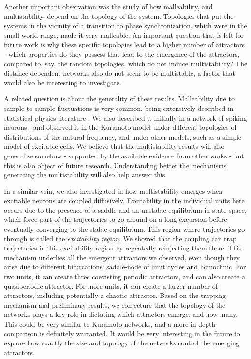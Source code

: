 Another important observation was the study of how malleability, and multistability, depend on the topology of the system. Topologies that put the systems in the vicinity of a transition to phase synchronization, which were in the small-world range, made it very malleable. An important question that is left for future work is why these specific topologies lead to a higher number of attractors - which properties do they possess that lead to the emergence of the attractors, compared to, say, the random topologies, which do not induce multistability? The distance-dependent networks also do not seem to be multistable, a factor that would also be interesting to investigate. 

A related question is about the generality of these results. Malleability due to sample-to-sample fluctuations is very common, being extensively described in statistical physics literature \cite{sornette2006critical}. We also described it initially in a network of spiking neurons \cite{budzinski2020synchronization}, and observed it in the Kuramoto model under different topologies of distributions of the natural frequency, and under other models, such as a simple model of excitable cells. We believe that the multistability results will also generalize somehow - supported by the available evidence from other works - but this is also object of future research. Understanding better the mechanisms generating the multistability will also help answer this.

In a similar vein, we also investigated in  how multistability emerges when excitable neurons are coupled diffusively. Excitability in the individual units here occurs due to the presence of a saddle and an unstable equilibrium in state space, which force part of the trajectories to go around on a long excursion before eventually converging to the stable equilibrium. This region where trajectories go through is called the \textit{excitability region}. We showed that the coupling can trap trajectories in this excitability region by repeatedly reinjecting them there. This mechanism underlies all the emergent attractors we observed, even though they arise due to different bifurcations: saddle-node of limit cycles and homoclinic. For two units, it can create three coexisting periodic attractors, and can also create a quasiperiodic attractor. For more units, it can create a larger number of attractors, including potentially a chaotic attractor. Based on the trapping mechanism and preliminary results, we conjecture that the topology of the networks plays a key role in dictating which attractors emerge, and how many. This could be very similar to Kuramoto networks, and a more in-depth comparison is definitely warranted. It would be very interesting in the future to explore how exactly the size and topology of the networks control the emerging attractors. 

